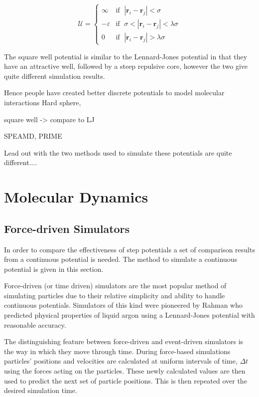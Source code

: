\message{ !name(main.tex)}\documentclass[12pt]{UoAthesis}
\begin{document}
\begin{equation}
  \label{eq:potentialSW}
  \mathcal{U} = 
  \begin{cases}
    \infty &\text{if }\; |\mathbf{r}_i - \mathbf{r}_j| < \sigma \\
    -\varepsilon &\text{if }\; \sigma < |\mathbf{r}_i - \mathbf{r}_j| < \lambda\sigma \\
    0 &\text{if }\; |\mathbf{r}_i - \mathbf{r}_j| > \lambda\sigma
  \end{cases}
\end{equation}

The square well potential is similar to the Lennard-Jones potential in
that they have an attractive well, followed by a steep repulsive core,
however the two give quite different simulation results.  


Hence people have created better discrete potentials to model molecular interactions
 Hard sphere,

square well -> compare to LJ

SPEAMD, PRIME

Lead out with the two methods used to simulate these potentials are quite different....




\chapter{Molecular Dynamics}

\section{Force-driven Simulators} 
In order to compare the effectiveness of step potentials a set of
comparison results from a continuous potential is needed.  The method
to simulate a continuous potential is given in this section.

Force-driven (or time driven) simulators are the most popular method
of simulating particles due to their relative simplicity and ability
to handle continuous potentials. Simulators of this kind were
pioneered by Rahman \cite{Rahman1964} who predicted physical
properties of liquid argon using a Lennard-Jones potential with
reasonable accuracy.

The distinguishing feature between force-driven and event-driven
simulators is the way in which they move through time. During
force-based simulations particles' positions and velocities are
calculated at uniform intervals of time, $\Delta t$ using the forces
acting on the particles. These newly calculated values are then used
to predict the next set of particle positions. This is then repeated
over the desired simulation time.
\end{document}
